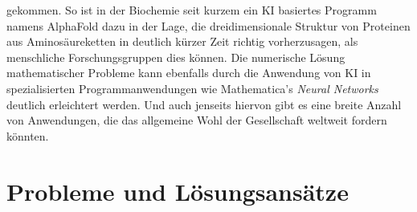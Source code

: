 \documentclass[a4paper,11pt]{article}
\begin{document}
gekommen. So ist in der Biochemie seit kurzem ein KI basiertes Programm namens AlphaFold dazu in der Lage, die dreidimensionale Struktur von Proteinen aus Aminosäureketten in deutlich kürzer Zeit richtig vorherzusagen, als menschliche Forschungsgruppen dies können. Die numerische Lösung mathematischer Probleme kann ebenfalls durch die Anwendung von KI in spezialisierten Programmanwendungen wie Mathematica's \textit{Neural Networks} deutlich erleichtert werden. Und auch jenseits hiervon gibt es eine breite Anzahl von Anwendungen, die das allgemeine Wohl der Gesellschaft weltweit fordern könnten.

  \newpage
    
    \section{Probleme und Lösungsansätze}
\end{document}

